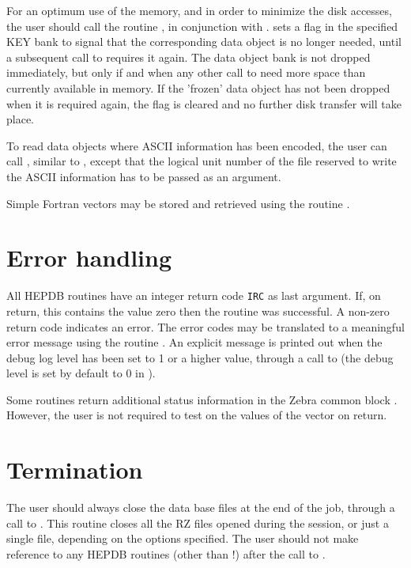 For an optimum use of the memory, and in order to minimize the disk
accesses, the user should call the routine , in conjunction with
.  sets a flag in the specified KEY bank to signal that the
corresponding data object is no longer needed, until a subsequent call
to  requires it again. The data object bank is not dropped
immediately, but only if and when any other call to  need more
space than currently available in memory. If the 'frozen' data object
has not been dropped when it is required again, the flag is cleared and
no further disk transfer will take place.

To read data objects where ASCII information has been encoded, the
user can call , similar to , except that the logical unit
number of the file reserved to write the ASCII information has to be
passed as an argument.

Simple Fortran vectors may be stored and retrieved using the
routine .

\section{Error handling}

All HEPDB routines have an integer return code {\tt IRC} as last
argument. If, on return, this contains the value zero then
the routine was successful. A non-zero return code indicates
an error. The error codes may be translated to a meaningful
error message using the routine .
An explicit message is printed out when the debug log level has been
set to 1 or a higher value, through a call to  (the debug level
is set by default to 0 in ).

Some routines return additional status information in the
Zebra common block .
However, the user is not required
to test on the values of the  vector on return.
%

\section{Termination}

The user should always close the data base files at the end of the
job, through a call to . This routine closes all the RZ files
opened during the session, or just a single file, depending on the
options specified.
The user should not make reference to any HEPDB routines
(other than  !) after the call to .

